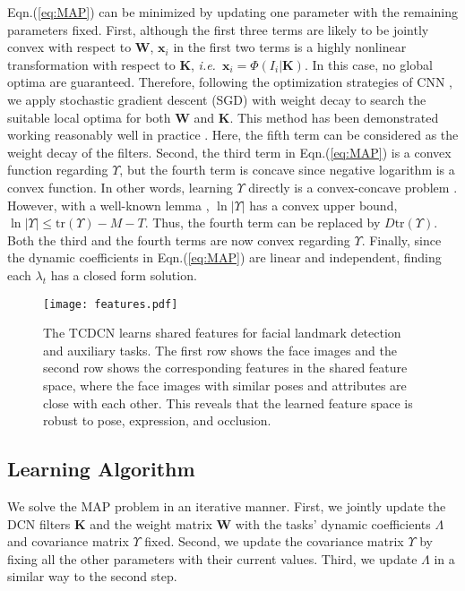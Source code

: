 \documentclass[10pt,journal,compsoc]{IEEEtran}
\newcommand{\x} {\textbf{x}}
\newcommand{\W} {\textbf{W}}
\newcommand{\K} {\textbf{K}}
\newcommand{\ie}{\emph{i.e.}~}
\begin{document}
Eqn.(\ref{eq:MAP}) can be minimized by updating one parameter with the remaining parameters fixed.
First, although the first three terms are likely to be jointly convex with respect to $\W$, $\x_i$ in the first two terms is a highly nonlinear transformation with respect to $\K$, \ie $\x_i=\Phi(I_i|\K)$.
In this case, no global optima are guaranteed. Therefore, following the optimization strategies of CNN \cite{lecun1998gradient}, we apply stochastic gradient descent (SGD) \cite{krizhevsky2012imagenet} with weight decay \cite{moody1995simple} to search the suitable local optima for both $\W$ and $\K$.
This method has been demonstrated working reasonably well in practice \cite{krizhevsky2012imagenet}.
Here, the fifth term can be considered as the weight decay of the filters.
Second, the third term in Eqn.(\ref{eq:MAP}) is a convex function regarding $\Upsilon$, but the fourth term is concave since negative logarithm is a convex function.
In other words, learning $\Upsilon$ directly is a convex-concave problem \cite{yuille2002concave}.
However, with a well-known lemma \cite{boyd2004convex}, $\ln|\Upsilon|$ has a convex upper bound, $\ln|\Upsilon|\leq\mathrm{tr}(\Upsilon)-M-T$. Thus, the fourth term can be replaced by $D\mathrm{tr}(\Upsilon)$. Both the third and the fourth terms are now convex regarding $\Upsilon$.
Finally, since the dynamic coefficients in Eqn.(\ref{eq:MAP}) are linear and independent, finding each $\lambda_t$ has a closed form solution.

\begin{figure*}[t]
  \centering
  \texttt{[image: features.pdf]}\\
  \vskip -0.3cm
  \caption{The TCDCN learns shared features for facial landmark detection and auxiliary tasks. The first row shows the face images and the second row shows the corresponding features in the shared feature space, where the face images with similar poses and attributes are close with each other. This reveals that the learned feature space is robust to pose, expression, and occlusion.
}\label{fig:features}
\end{figure*}
\subsection{Learning Algorithm}
\label{sec:learningnetwork}


We solve the MAP problem in an iterative manner. First, we jointly update the DCN filters $\K$ and the weight matrix $\W$ with the tasks' dynamic coefficients $\Lambda$ and covariance matrix $\Upsilon$ fixed.
Second, we update the covariance matrix $\Upsilon$ by fixing all the other parameters with their current values.
Third, we update $\Lambda$ in a similar way to the second step.
\end{document}

